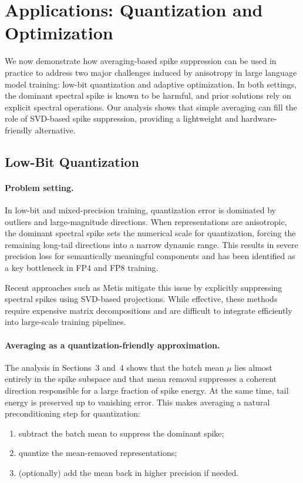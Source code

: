 \section{Applications: Quantization and Optimization}
\label{sec:applications}

We now demonstrate how averaging-based spike suppression can be used in practice
to address two major challenges induced by anisotropy in large language model
training: low-bit quantization and adaptive optimization.
In both settings, the dominant spectral spike is known to be harmful, and prior
solutions rely on explicit spectral operations.
Our analysis shows that simple averaging can fill the role of SVD-based spike
suppression, providing a lightweight and hardware-friendly alternative.

\subsection{Low-Bit Quantization}
\label{subsec:quantization}

\paragraph{Problem setting.}
In low-bit and mixed-precision training, quantization error is dominated by
outliers and large-magnitude directions.
When representations are anisotropic, the dominant spectral spike sets the
numerical scale for quantization, forcing the remaining long-tail directions
into a narrow dynamic range.
This results in severe precision loss for semantically meaningful components and
has been identified as a key bottleneck in FP4 and FP8 training.

Recent approaches such as Metis mitigate this issue by explicitly suppressing
spectral spikes using SVD-based projections.
While effective, these methods require expensive matrix decompositions and are
difficult to integrate efficiently into large-scale training pipelines.

\paragraph{Averaging as a quantization-friendly approximation.}
The analysis in Sections~3 and~4 shows that the batch mean $\mu$ lies almost
entirely in the spike subspace and that mean removal suppresses a coherent
direction responsible for a large fraction of spike energy.
At the same time, tail energy is preserved up to vanishing error.
This makes averaging a natural preconditioning step for quantization:
\begin{enumerate}
  \item subtract the batch mean to suppress the dominant spike;
  \item quantize the mean-removed representations;
  \item (optionally) add the mean back in higher precision if needed.
\end{enumerate}

